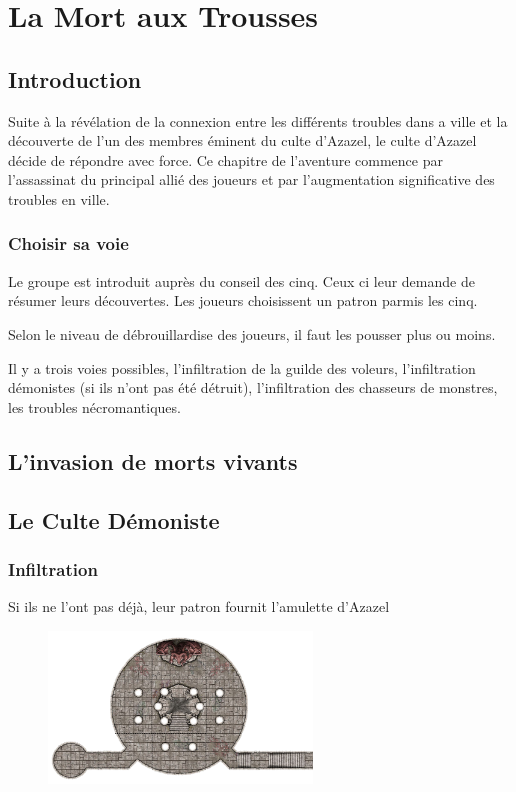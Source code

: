 \section{La Mort aux Trousses}

\subsection*{Introduction}

Suite à la révélation de la connexion entre les différents troubles dans a ville et
la découverte de l'un des membres éminent du culte d'Azazel, le culte d'Azazel décide 
de répondre avec force. Ce chapitre de l'aventure commence par l'assassinat du 
principal allié des joueurs et par l'augmentation significative des troubles en ville.

\subsubsection*{Choisir sa voie}

Le groupe est introduit auprès du conseil des cinq. Ceux ci leur demande de 
résumer leurs découvertes. Les joueurs choisissent un patron parmis les cinq.

Selon le niveau de débrouillardise des joueurs, il faut les pousser plus ou moins.

Il y a trois voies possibles, l'infiltration de la guilde des voleurs, l'infiltration
démonistes (si ils n'ont pas été détruit), l'infiltration des chasseurs de monstres,
les troubles nécromantiques.

\subsection*{L'invasion de morts vivants}

\subsection*{Le Culte Démoniste}

\subsubsection*{Infiltration}
Si ils ne l'ont pas déjà, leur patron fournit l'amulette d'Azazel

\begin{figure}[htb!]
\center
\includegraphics[width=7cm]{Maps/Temple.png}
\end{figure}

